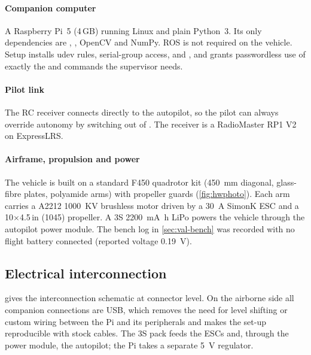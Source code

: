 \paragraph{Companion computer} A Raspberry Pi~5 (4\,GB) running Linux and plain Python~3. Its only
dependencies are , , OpenCV and NumPy. ROS is not
required on the vehicle. Setup installs udev rules, serial-group access,
 and , and grants passwordless use of exactly the
 and  commands the supervisor needs.

\paragraph{Pilot link} The RC receiver connects directly to the autopilot, so the pilot
can always override autonomy by switching out of . The
receiver is a RadioMaster RP1 V2 on ExpressLRS.

\paragraph{Airframe, propulsion and power} The vehicle is built on a standard F450
quadrotor kit (\SI{450}{\milli\metre} diagonal, glass-fibre plates, polyamide arms) with
propeller guards (\cref{fig:hwphoto}). Each arm carries a A2212
\SI{1000}{KV} brushless motor driven by a \SI{30}{\ampere} SimonK ESC and a
10$\times$4.5\,in (1045) propeller. A 3S \SI{2200}{\milli\ampere\hour} LiPo powers
the vehicle through the autopilot power module. The bench log in \cref{sec:val-bench}
was recorded with no flight battery connected (reported voltage \SI{0.19}{\volt}).

\subsection{Electrical interconnection}

 gives the interconnection schematic at connector level. On the
airborne side all companion connections are USB, which removes the need for level
shifting or custom wiring between the Pi and its peripherals and makes the set-up
reproducible with stock cables. The 3S pack feeds the ESCs and, through the
power module, the autopilot; the Pi takes a separate \SI{5}{\volt} regulator.

